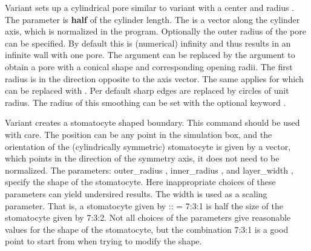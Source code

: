 Variant  sets up a cylindrical pore similar to variant
 with a center    and radius
. The  parameter is \textbf{half} of the cylinder
length. The  is a vector along the cylinder axis, which is
normalized in the program. Optionally the outer radius of the pore can
be specified. By default this is (numerical) infinity and thus results in 
an infinite wall with one pore. The argument  can 
be replaced by the argument  to obtain a 
pore with a conical shape and corresponding opening radii. The first radius 
is in the direction opposite to the axis vector. The same applies for 
 which can be replaced  with 
. Per default sharp edges are
replaced by circles of unit radius. The radius of this smoothing can be set
with the optional keyword .


Variant  creates a stomatocyte shaped boundary. This command
should be used with care. The position can be any point in the simulation
box, and the orientation of the (cylindrically symmetric) stomatocyte is
given by a vector, which points in the direction of the symmetry axis, it
does not need to be normalized. The parameters: outer_radius ,
inner_radius , and layer_width , specify the shape of the
stomatocyte. Here inappropriate choices of these parameters can yield 
undersired results. The width is used as a scaling parameter. That is,
a stomatocyte given by :: = 7:3:1 is half the size
of the stomatocyte given by 7:3:2. Not all choices of the parameters give
reasonable values for the shape of the stomatocyte, but the combination
7:3:1 is a good point to start from when trying to modify the shape. 

